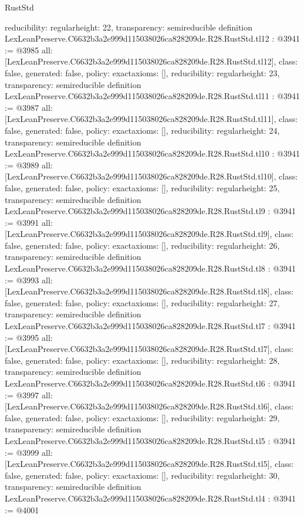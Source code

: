 \begin{lexlean}{RustStd}
\begin{coremodule}
{  reducibility: regular{height: 22},
  transparency: semireducible
}
definition LexLeanPreserve.C6632b3a2e999d115038026ca828209de.R28.RustStd.tl12 : @3941 := @3985 {
  all: [LexLeanPreserve.C6632b3a2e999d115038026ca828209de.R28.RustStd.tl12],
  class: false,
  generated: false,
  policy: exact{axioms: []},
  reducibility: regular{height: 23},
  transparency: semireducible
}
definition LexLeanPreserve.C6632b3a2e999d115038026ca828209de.R28.RustStd.tl11 : @3941 := @3987 {
  all: [LexLeanPreserve.C6632b3a2e999d115038026ca828209de.R28.RustStd.tl11],
  class: false,
  generated: false,
  policy: exact{axioms: []},
  reducibility: regular{height: 24},
  transparency: semireducible
}
definition LexLeanPreserve.C6632b3a2e999d115038026ca828209de.R28.RustStd.tl10 : @3941 := @3989 {
  all: [LexLeanPreserve.C6632b3a2e999d115038026ca828209de.R28.RustStd.tl10],
  class: false,
  generated: false,
  policy: exact{axioms: []},
  reducibility: regular{height: 25},
  transparency: semireducible
}
definition LexLeanPreserve.C6632b3a2e999d115038026ca828209de.R28.RustStd.tl9 : @3941 := @3991 {
  all: [LexLeanPreserve.C6632b3a2e999d115038026ca828209de.R28.RustStd.tl9],
  class: false,
  generated: false,
  policy: exact{axioms: []},
  reducibility: regular{height: 26},
  transparency: semireducible
}
definition LexLeanPreserve.C6632b3a2e999d115038026ca828209de.R28.RustStd.tl8 : @3941 := @3993 {
  all: [LexLeanPreserve.C6632b3a2e999d115038026ca828209de.R28.RustStd.tl8],
  class: false,
  generated: false,
  policy: exact{axioms: []},
  reducibility: regular{height: 27},
  transparency: semireducible
}
definition LexLeanPreserve.C6632b3a2e999d115038026ca828209de.R28.RustStd.tl7 : @3941 := @3995 {
  all: [LexLeanPreserve.C6632b3a2e999d115038026ca828209de.R28.RustStd.tl7],
  class: false,
  generated: false,
  policy: exact{axioms: []},
  reducibility: regular{height: 28},
  transparency: semireducible
}
definition LexLeanPreserve.C6632b3a2e999d115038026ca828209de.R28.RustStd.tl6 : @3941 := @3997 {
  all: [LexLeanPreserve.C6632b3a2e999d115038026ca828209de.R28.RustStd.tl6],
  class: false,
  generated: false,
  policy: exact{axioms: []},
  reducibility: regular{height: 29},
  transparency: semireducible
}
definition LexLeanPreserve.C6632b3a2e999d115038026ca828209de.R28.RustStd.tl5 : @3941 := @3999 {
  all: [LexLeanPreserve.C6632b3a2e999d115038026ca828209de.R28.RustStd.tl5],
  class: false,
  generated: false,
  policy: exact{axioms: []},
  reducibility: regular{height: 30},
  transparency: semireducible
}
definition LexLeanPreserve.C6632b3a2e999d115038026ca828209de.R28.RustStd.tl4 : @3941 := @4001 {
}
\end{coremodule}
\end{lexlean}
